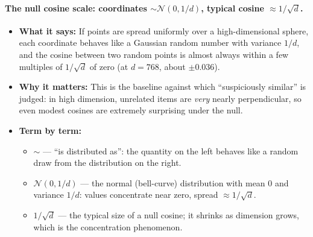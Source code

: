 \documentclass[11pt,letterpaper]{article}
\begin{document}
\paragraph{The null cosine scale: coordinates $\sim \mathcal N(0, 1/d)$,
typical cosine $\approx 1/\sqrt d$.}
\begin{itemize}
  \item \textbf{What it says:} If points are spread uniformly over a
  high-dimensional sphere, each coordinate behaves like a Gaussian random
  number with variance $1/d$, and the cosine between two random points is
  almost always within a few multiples of $1/\sqrt d$ of zero (at $d =
  768$, about $\pm 0.036$).
  \item \textbf{Why it matters:} This is the baseline against which
  ``suspiciously similar'' is judged: in high dimension, unrelated items
  are \emph{very} nearly perpendicular, so even modest cosines are
  extremely surprising under the null.
  \item \textbf{Term by term:}
  \begin{itemize}
    \item $\sim$ --- ``is distributed as'': the quantity on the left
    behaves like a random draw from the distribution on the right.
    \item $\mathcal N(0, 1/d)$ --- the normal (bell-curve) distribution
    with mean $0$ and variance $1/d$: values concentrate near zero, spread
    $\approx 1/\sqrt d$.
    \item $1/\sqrt d$ --- the typical size of a null cosine; it shrinks as
    dimension grows, which is the concentration phenomenon.
  \end{itemize}
\end{itemize}
\end{document}
